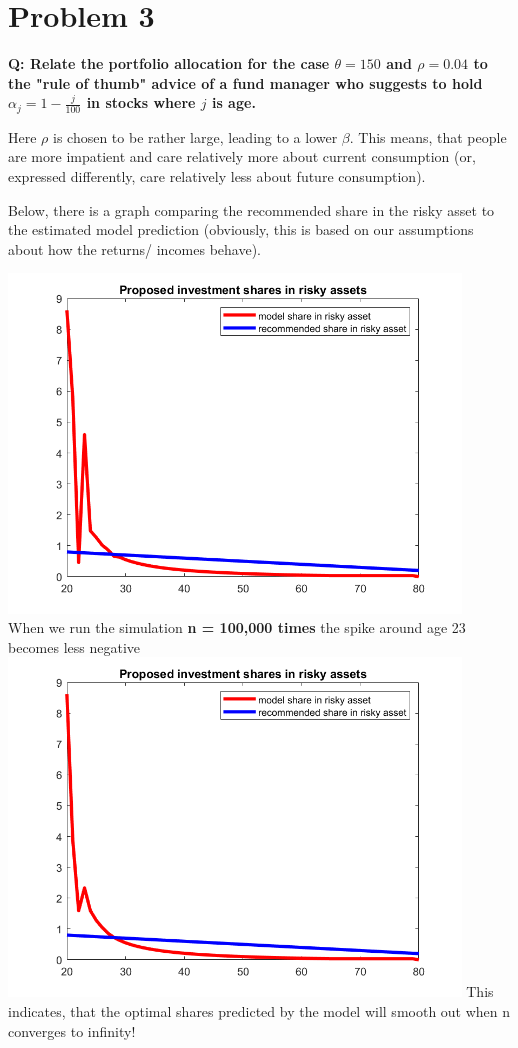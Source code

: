 \documentclass[12pt,a4paper]{article}
\begin{document}
\section*{Problem 3}
\textbf{Q: Relate the portfolio allocation for the case $\theta = 150$ and $\rho = 0.04$ to the "rule of thumb" advice of a fund manager who suggests to hold $\alpha_j = 1- \frac{j}{100}$ in stocks where $j$ is age.}

Here $\rho$ is chosen to be rather large, leading to a lower $\beta$. This means, that people are more impatient and care relatively more about current consumption (or, expressed differently, care relatively less about future consumption).

Below, there is a graph comparing the recommended share in the risky asset to the estimated model prediction (obviously, this is based on our assumptions about how the returns/ incomes behave).

\includegraphics[width = 0.9\textwidth]{PS3/sharesriskyasset.png}
\\
When we run the simulation \textbf{n = 100,000 times} the spike around age 23 becomes less negative\\
\includegraphics[width = 0.9\textwidth]{PS3/sharesriskyassetns100000.png}
This indicates, that the optimal shares predicted by the model will smooth out when n converges to infinity!
\end{document}
